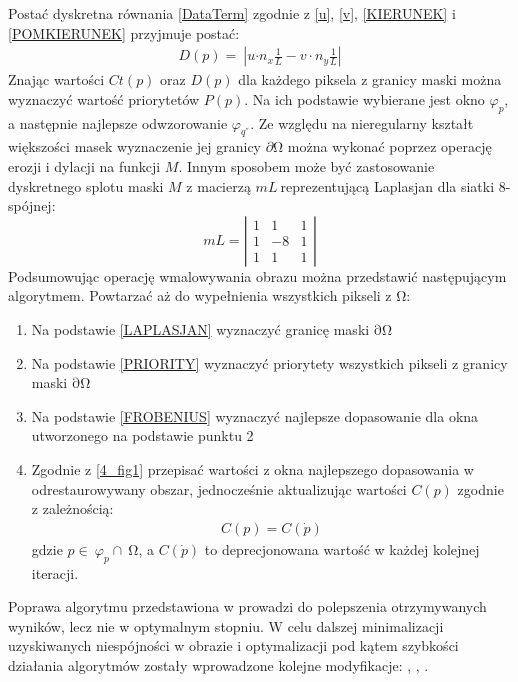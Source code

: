 \documentclass[12pt, twoside, openany]{report}
\theoremstyle{definition}
\begin{document}
Postać dyskretna równania \eqref{DataTerm} zgodnie z \eqref{u}, \eqref{v}, \eqref{KIERUNEK} i \eqref{POMKIERUNEK} przyjmuje postać:
\begin{align}
D(p)=\ \left|u{\cdot n}_x\frac{1}{L}-v\cdot n_y\frac{1}{L}\right|
\end{align}
Znając wartości $Ct\left(p\right)$ oraz $D(p)$ dla każdego piksela z granicy maski można wyznaczyć wartość priorytetów $P(p)$. Na ich podstawie wybierane jest okno ${\varphi }_p$, a następnie najlepsze odwzorowanie ${\varphi }_{q^{''}}$. Ze względu na nieregularny kształt większości masek wyznaczenie jej granicy $\partial \mathrm{\Omega }$ można wykonać poprzez operację erozji i dylacji na funkcji $M$. Innym sposobem może być zastosowanie dyskretnego splotu maski $M$ z macierzą $mL\ $reprezentującą Laplasjan dla siatki 8-spójnej: 
\begin{equation}
mL=\left| \begin{array}{ccc}
1 & 1 & 1 \\ 
1 & -8 & 1 \\ 
1 & 1 & 1 \end{array}
\right|	
\label{LAPLASJAN}
\end{equation}
Podsumowując operację wmalowywania obrazu można przedstawić następującym algorytmem. Powtarzać aż do wypełnienia wszystkich pikseli z $\mathrm{\Omega }$:
\begin{enumerate}
\item
Na podstawie \eqref{LAPLASJAN} wyznaczyć granicę maski $\mathrm{\partial }\mathrm{\Omega }$
\item
Na podstawie \eqref{PRIORITY} wyznaczyć priorytety wszystkich pikseli z granicy maski $\mathrm{\partial }\mathrm{\Omega }$
\item
Na podstawie \eqref{FROBENIUS} wyznaczyć najlepsze dopasowanie dla okna utworzonego na podstawie punktu 2 
\item
Zgodnie z \autoref{4_fig1} przepisać wartości z okna najlepszego dopasowania w odrestaurowywany obszar, jednocześnie aktualizując wartości $C(p)$ zgodnie z zależnością:
\begin{align}
C\left(p\right)=C\left(\dot{p}\right)
\end{align} 
gdzie $p\in \ {\varphi }_p\cap \ \mathrm{\Omega }$, a $C\left(\dot{p}\right)$ to deprecjonowana wartość w każdej kolejnej iteracji.
\end{enumerate}
Poprawa algorytmu przedstawiona w \cite{criminisi2004region} prowadzi do polepszenia otrzymywanych wyników, lecz nie w optymalnym stopniu. W celu dalszej minimalizacji uzyskiwanych niespójności w obrazie i optymalizacji pod kątem szybkości działania algorytmów zostały wprowadzone kolejne modyfikacje: \cite{StructurePropagationManual},  \cite{malluvalasaimplementation}, \cite{SalientStrucTexProp}. 
\end{document}
